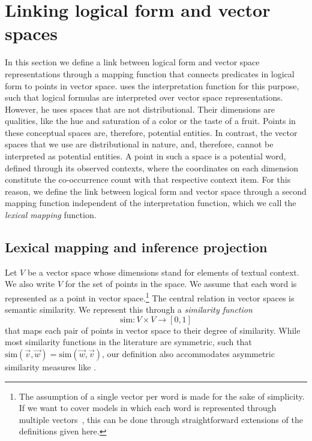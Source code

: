 \newcommand{\loglang}{\ensuremath{{\cal{L}}}\xspace}
\newcommand{\predsym}[1]{\ensuremath{{\cal{P}}_{#1}}\xspace}
\newcommand{\simfunc}{\ensuremath{\mathrm{sim}}\xspace}

\section{Linking logical form and vector spaces}
\label{sec:interface}

In this section we define a link between logical form and vector space
representations through a mapping function that connects predicates in logical
form to points in vector space. \citet{gardenfors:book2004} uses the
interpretation function for this purpose, such that logical formulas are
interpreted over vector space representations. However, he uses spaces
that are not distributional. Their dimensions are qualities, like the hue and saturation of a color or the taste of
a fruit. Points in these conceptual spaces are, therefore, potential entities. In
contrast, the vector spaces that we use are distributional in nature, and, therefore, cannot be interpreted as potential
entities. A point in such a space is a potential word, defined through
its observed contexts, where the coordinates on each dimension constitute the
co-occurrence count with that respective context item. For
this reason, we define the link between logical form and vector space through a
second mapping function independent of the interpretation function, which we
call the \emph{lexical mapping} function.

\subsection*{Lexical mapping and inference projection} 


Let $V$ be a vector space whose dimensions stand for elements of  textual
context. We also write $V$ for the set of points in the space. We assume that
each word is represented as a point in vector space.\footnote{The assumption of
a single vector per word is made for the sake of simplicity. If we want to cover
models in which each word is represented through multiple
vectors~\citep{reisinger:naacl2010,dinu:emnlp2010}, this can be done through
straightforward extensions of the definitions given here.}
The central relation in vector spaces is semantic similarity. We represent this
through a \textit{similarity function} \[\simfunc: V \times V \to [0,1] \] that
maps each pair of points in vector space to their degree of similarity. While
most similarity functions in the literature are symmetric, such that 
$\simfunc(\vec v, \vec w) = \simfunc(\vec w, \vec v)$, our definition also
accommodates asymmetric similarity measures like \citet{kotlerman:nlej2010}.


